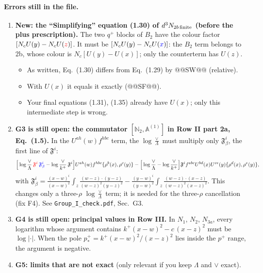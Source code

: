 \documentclass[10pt]{article}
\numberwithin{equation}{section}
\newcommand{\new}[1]{{\color{blue}#1}}
\newcommand{\old}[1]{{\color{red}#1}}
\def\mf#1{\mathbb{#1}}
\begin{document}
\paragraph{Errors still in the file.}
\begin{enumerate}
\item[\textbf{R1}] \textbf{New: the ``Simplifying'' equation (1.30) of $d^3N_{2b\,\rm finite}$ (before the plus prescription).} The two $q^+$ blocks of $B_2$ have the colour factor $[N_cU(y)-N_cU(\old{z})]$. It must be $[N_cU(y)-N_cU(\new{x})]$: the $B_2$ term belongs to 2b, whose colour is $N_c[U(y)-U(x)]$; only the counterterm has $U(z)$.
\begin{itemize}
\item As written, Eq.~(1.30) differs from Eq.~(1.29) by @@SW@@ (relative).
\item With $U(x)$ it equals it exactly (@@SF@@).
\item Your final equations (1.31), (1.35) already have $U(x)$; only this intermediate step is wrong.
\end{itemize}
\item[\textbf{R2}] \textbf{G3 is still open: the commutator $[\mf N_2,\mf A^{(1)}]$ in Row II part 2a, Eq.~(1.5).} In the $U^{ah}(w)f^{hbc}$ term, the $\log\frac{\vee}{\Lambda}$ must multiply only $\mathfrak F^i_\beta$, the first line of $\mathfrak F^i$:
\begin{equation*}
\Big[\log\frac{\vee}{\Lambda}\,\old{\mathfrak F^i}\,\new{\mathfrak F^i_\beta}-\log\frac{\vee}{k^+}\,\mathfrak F^i\Big]U^{ah}(w)f^{hbc}\{\rho^b(x),\rho^c(y)\}-\Big[\log\frac{\vee}{\Lambda}-\log\frac{\vee}{k^+}\Big]\mathfrak F^i f^{abc}U^{bd}(x)U^{ce}(y)\{\rho^d(x),\rho^e(y)\},
\end{equation*}
with $\mathfrak F^i_\beta=\frac{(x-w)^i}{(x-w)^2}\int_z\frac{(w-z)\cdot(y-z)}{(w-z)^2(y-z)^2}-\frac{(y-w)^i}{(y-w)^2}\int_z\frac{(w-z)\cdot(x-z)}{(w-z)^2(x-z)^2}$. This changes only a three-$\rho$ $\log\frac{\vee}{\Lambda}$ term; it is needed for the three-$\rho$ cancellation (fix F4). See \texttt{Group\_I\_check.pdf}, Sec.~G3.
\item[\textbf{R3}] \textbf{G4 is still open: principal values in Row III.} In $N_1$, $N_2$, $N_{3a}$, every logarithm whose argument contains $k^+(x-w)^2-c\,(x-z)^2$ must be $\log|\cdot|$. When the pole $p^+_*=k^+(x-w)^2/(x-z)^2$ lies inside the $p^+$ range, the argument is negative.
\item[\textbf{R4}] \textbf{G5: limits that are not exact} (only relevant if you keep $\Lambda$ and $\vee$ exact).
\begin{itemize}

\end{itemize}
\end{enumerate}
\end{document}
